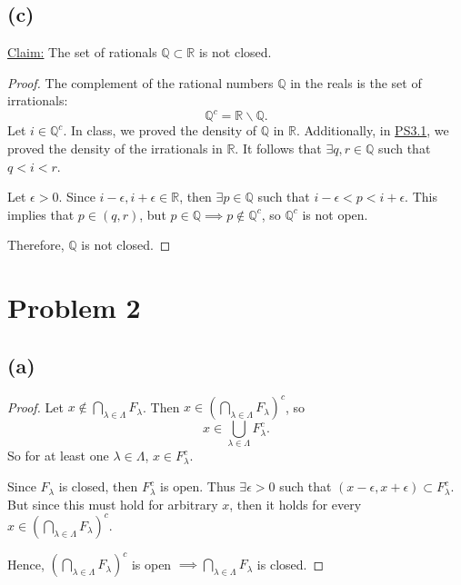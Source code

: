 \documentclass{article}
\begin{document}
\subsection*{(c)}
\underline{Claim:} The set of rationals $\mathbb{Q}\subset\mathbb{R}$ is not closed.
\begin{proof}
	The complement of the rational numbers $\mathbb{Q}$ in the reals is the set of irrationals:
	\begin{equation}
		\mathbb{Q}^c = \mathbb{R} \backslash \mathbb{Q}.
	\end{equation}
	Let $i \in \mathbb{Q}^c$. In class, we proved the density of $\mathbb{Q}$ in $\mathbb{R}$. Additionally, in \href{https://github.com/ovega14/RealAnalysis_solutions/blob/main/PS3/18.100A_ps3.pdf}{PS3.1}, we proved the density of the irrationals in $\mathbb{R}$. It follows that $\exists q, r \in \mathbb{Q}$ such that $q<i<r$.
	
	Let $\epsilon>0$. Since $i-\epsilon, i+\epsilon \in \mathbb{R}$, then $\exists p\in\mathbb{Q}$ such that $i-\epsilon<p<i+\epsilon$. This implies that $p\in(q,r)$, but $p \in \mathbb{Q} \implies p\notin \mathbb{Q}^c$, so $\mathbb{Q}^c$ is not open.
	
	Therefore, $\mathbb{Q}$ is not closed.
\end{proof}
\section*{Problem 2}
\subsection*{(a)}
\begin{proof}
	Let $x \notin \bigcap_{\lambda \in \Lambda} F_{\lambda}$. Then $x\in\left(\bigcap_{\lambda\in\Lambda}F_{\lambda}\right)^c$, so
	\begin{equation}
		x \in \bigcup\limits_{\lambda \in \Lambda}F_{\lambda}^c.
	\end{equation}
	So for at least one $\lambda \in \Lambda$, $x\in F_{\lambda}^c$.
	
	Since $F_{\lambda}$ is closed, then $F_{\lambda}^c$ is open. Thus $\exists \epsilon>0$ such that $(x-\epsilon, x+\epsilon)\subset F_{\lambda}^c$. But since this must hold for arbitrary $x$, then it holds for every \\$x\in \left(\bigcap_{\lambda\in\Lambda}F_{\lambda}\right)^c$. 
	
	Hence, $\left(\bigcap_{\lambda\in\Lambda}F_{\lambda}\right)^c$ is open $\implies \bigcap_{\lambda\in\Lambda}F_{\lambda}$ is closed.
\end{proof}
\end{document}
